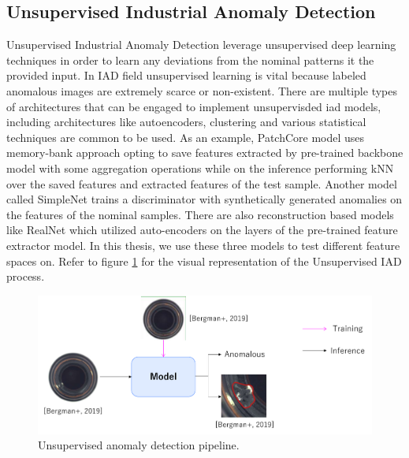 \clearpage
\subsection{Unsupervised Industrial Anomaly Detection}
\label{unsupervised iad}
Unsupervised Industrial Anomaly Detection leverage unsupervised deep learning techniques in order to learn any deviations from the nominal patterns it the provided input. In IAD field unsupervised learning is vital because labeled anomalous images are extremely scarce or non-existent\cite{mvtecad}\cite{realnet}. There are multiple types of architectures that can be engaged to implement unsupervisded iad models, including architectures like autoencoders\cite{realnet}, clustering\cite{patchcore} and various statistical techniques are common to be used\cite{uiad_survey}. As an example, PatchCore\cite{patchcore} model uses memory-bank approach opting to save features extracted by pre-trained backbone model with some aggregation operations while on the inference performing kNN over the saved features and extracted features of the test sample. Another model called SimpleNet trains a discriminator with synthetically generated anomalies on the features of the nominal samples. There are also reconstruction based models like RealNet\cite{realnet} which utilized auto-encoders on the layers of the pre-trained feature extractor model. In this thesis, we use these three models to test different feature spaces on. Refer to figure \ref{fig:uiad} for the visual representation of the Unsupervised IAD process.

\begin{figure}[t]
	\begin{center}
		\includegraphics[width=0.8\linewidth]{Chapter_2/uiad.png}
	\end{center}
	\caption{Unsupervised anomaly detection pipeline.}
	\label{fig:uiad}
\end{figure}

\clearpage
